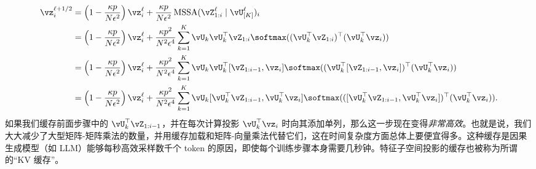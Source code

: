 \documentclass[../../book-main_zh.tex]{subfiles}
\begin{document}
\begin{align}
    \vz_{i}^{\ell + 1/2}
    &= \left(1 - \frac{\kappa p}{N\epsilon^{2}}\right)\vz_{i}^{\ell}
    + \frac{\kappa p}{N
    \epsilon^{2}}\operatorname{MSSA}(\vZ_{1:i}^{\ell} \mid
    \vU_{[K]}^{\ell})_{i} \\
    &= \left(1 - \frac{\kappa p}{N\epsilon^{2}}\right)\vz_{i}^{\ell}
    + \frac{\kappa p^{2}}{N^{2} \epsilon^{4}}\sum_{k =
    1}^{K}\vU_{k}\vU_{k}^{\top}\vZ_{1:i}\softmax((\vU_{k}^{\top}\vZ_{1:i})^{\top}(\vU_{k}^{\top}\vz_{i}))
    \\
    &= \left(1 - \frac{\kappa p}{N\epsilon^{2}}\right)\vz_{i}^{\ell}
    + \frac{\kappa p^{2}}{N^{2} \epsilon^{4}}\sum_{k =
    1}^{K}\vU_{k}\vU_{k}^{\top}[\vZ_{1:i-1},
    \vz_{i}]\softmax((\vU_{k}^{\top}[\vZ_{1:i-1},
    \vz_{i}])^{\top}(\vU_{k}^{\top}\vz_{i})) \\
    &= \left(1 - \frac{\kappa p}{N\epsilon^{2}}\right)\vz_{i}^{\ell}
    + \frac{\kappa p^{2}}{N^{2} \epsilon^{4}}\sum_{k =
    1}^{K}\vU_{k}[\vU_{k}^{\top}\vZ_{1:i-1},
    \vU_{k}^{\top}\vz_{i}]\softmax(([\vU_{k}^{\top}\vZ_{1:i-1},
    \vU_{k}^{\top}\vz_{i}])^{\top}(\vU_{k}^{\top}\vz_{i})).
\end{align}
如果我们缓存前面步骤中的 \(\vU_{k}^{\top}\vZ_{1:i-1}\)，并在每次计算投影 \(\vU_{k}^{\top}\vz_{i}\) 时向其添加单列，那么这一步现在变得\textit{非常高效}。也就是说，我们大大减少了大型矩阵-矩阵乘法的数量，并用缓存加载和矩阵-向量乘法代替它们，这在时间复杂度方面总体上要便宜得多。这种缓存是因果生成模型（如 LLM）能够每秒高效采样数千个 token 的原因，即使每个训练步骤本身需要几秒钟。特征子空间投影的缓存也被称为所谓的“KV 缓存”。
\end{document}
